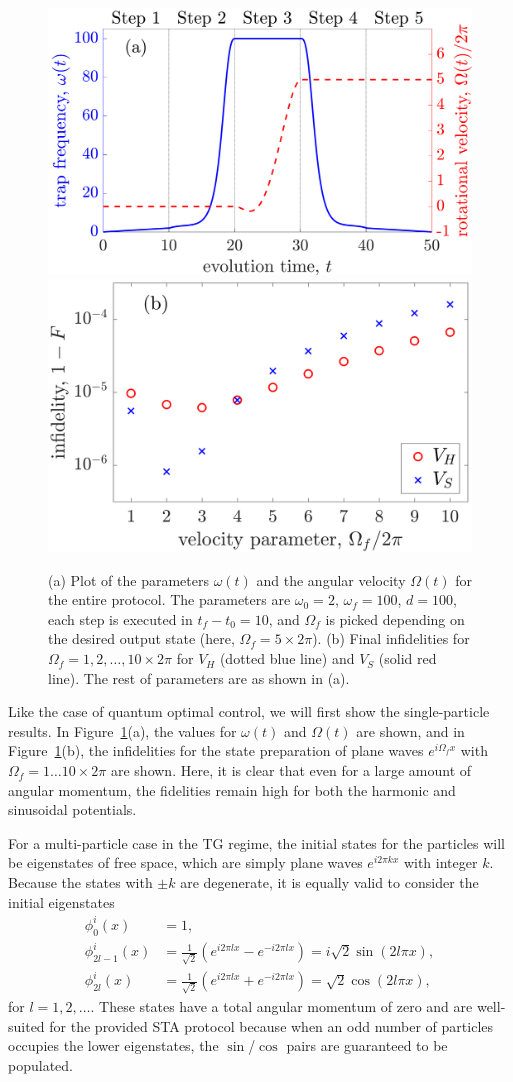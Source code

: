 \begin{figure}
\centering
\includegraphics[width=0.45\linewidth]{data/1d/fig5.png}
\includegraphics[width= 0.45\linewidth]{data/1d/fig6.png}
\caption{
(a) Plot of the parameters $\omega(t)$ and the angular velocity $\Omega(t)$ for the entire protocol.
The parameters are $\omega_0=2$, $\omega_f=100$, $d=100$, each step is executed in $t_f-t_0=10$, and $\Omega_f$ is picked depending on the desired output state (here, $\Omega_f=5 \times 2\pi$).
(b) Final infidelities for $\Omega_f=1,2,\ldots,10 \times 2\pi$ for $V_H$ (dotted blue line) and $V_S$ (solid red line).
The rest of parameters are as shown in (a).
}
\label{fig:final+param}
\end{figure}

Like the case of quantum optimal control, we will first show the single-particle results.
In Figure~\ref{fig:final+param}(a), the values for $\omega(t)$ and $\Omega(t)$ are shown, and
in Figure~\ref{fig:final+param}(b), the infidelities for the state preparation of plane waves $e^{i \Omega_f x}$ with $\Omega_f=1\ldots10 \times 2 \pi$ are shown.
Here, it is clear that even for a large amount of angular momentum, the fidelities remain high for both the harmonic and sinusoidal potentials.

For a multi-particle case in the TG regime, the initial states for the particles will be eigenstates of free space, which are simply plane waves $e^{i 2 \pi k x}$ with integer $k$.
Because the states with $\pm k$ are degenerate, it is equally valid to consider the initial eigenstates
\begin{align}
\phi^i_0(x)&=1,\\
\phi^i_{2l-1}(x)&=\frac{1}{\sqrt 2} \left( e^{i 2 \pi l x}-e^{-i 2 \pi l x} \right)= i \sqrt{2} \sin(2 l \pi x), \\
\phi^i_{2l}(x)&= \frac{1}{\sqrt 2}\left( e^{i 2 \pi l x}+e^{-i 2 \pi l x} \right) = \sqrt{2} \cos(2 l \pi x),
\end{align}
for $l=1,2,\ldots$.
These states have a total angular momentum of zero and are well-suited for the provided STA protocol because when an odd number of particles occupies the lower eigenstates, the $\sin$/$\cos$ pairs are guaranteed to be populated.

